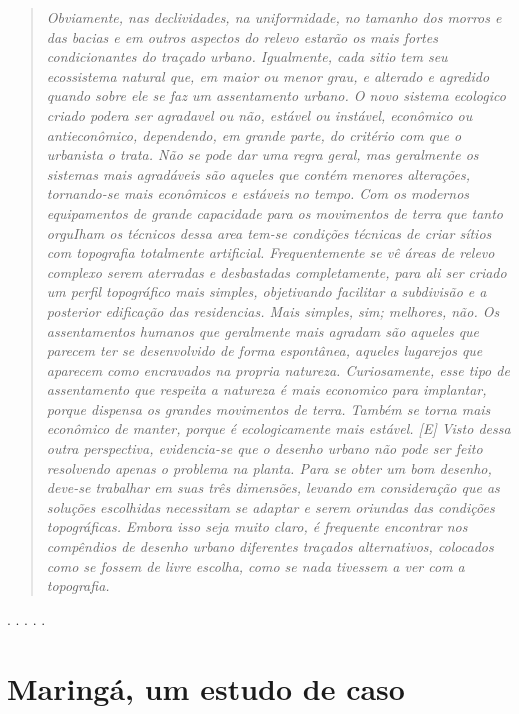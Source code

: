 \documentclass[12pt, a4paper]{book} %
\begin{document}
            \begin{quotation} 
                \textit{Obviamente, nas declividades, na uniformidade, no tamanho dos morros e das bacias e em outros aspectos do relevo estarão os mais fortes condicionantes do traçado urbano.
                Igualmente, cada sitio tem seu ecossistema natural que, em maior ou menor grau, e alterado e agredido quando sobre ele se faz um assentamento urbano. O novo sistema ecologico criado podera ser agradavel ou não, estável ou instável, econômico ou antieconômico, dependendo, em grande parte, do critério com que o urbanista o trata.
                Não se pode dar uma regra geral, mas geralmente os sistemas mais agradáveis são aqueles que contém menores alterações, tornando-se mais econômicos e estáveis no tempo.
                Com os modernos equipamentos de grande capacidade para os movimentos de terra que tanto orguIham os técnicos dessa area tem-se condições técnicas de criar sítios com topografia totalmente artificial. Frequentemente se vê áreas de relevo complexo serem aterradas e desbastadas completamente, para ali ser criado um perfil topográfico mais simples, objetivando facilitar a subdivisão e a posterior edificação das residencias. Mais simples, sim; melhores, não. 
                Os assentamentos humanos que geralmente mais agradam são aqueles que parecem ter se desenvolvido de forma espontânea, aqueles lugarejos que aparecem como encravados na propria natureza. Curiosamente, esse tipo de assentamento que respeita a natureza é mais economico para implantar, porque dispensa os grandes movimentos de terra. Também se torna mais econômico de manter, porque é ecologicamente mais estável. 
                [E] Visto dessa outra perspectiva, evidencia-se que o desenho urbano não pode ser feito resolvendo apenas o problema na planta. Para se obter um bom desenho, deve-se trabalhar em suas três dimensões, levando em consideração que as soluções escolhidas necessitam se adaptar e serem oriundas das condições topográficas. 
                Embora isso seja muito claro, é frequente encontrar nos compêndios de desenho urbano diferentes traçados alternativos, colocados como se fossem de livre escolha, como se nada tivessem a ver com a topografia.}
            \end{quotation}

        \begin{center}
            . . . . .
        \end{center} 

        \chapter[Maringá, um estudo de caso]{Maringá, um estudo de caso}
\end{document}
